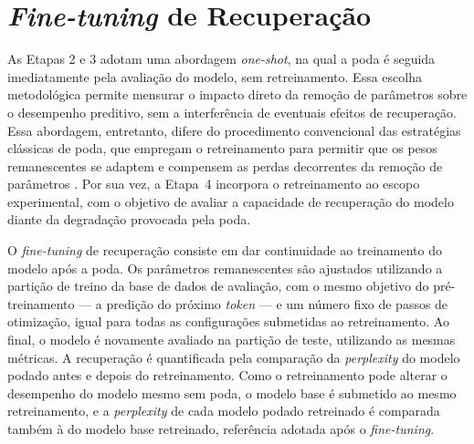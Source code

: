\section{\textit{Fine-tuning} de Recuperação}\label{sec:metodologia_finetuning}

As Etapas 2 e 3 adotam uma abordagem \textit{one-shot}, na qual a poda é seguida
imediatamente pela avaliação do modelo, sem retreinamento. Essa escolha metodológica permite
mensurar o impacto direto da remoção de parâmetros sobre o desempenho preditivo, sem a
interferência de eventuais efeitos de recuperação. Essa abordagem, entretanto, difere do
procedimento convencional das estratégias clássicas de poda, que empregam o retreinamento
para permitir que os pesos remanescentes se adaptem e compensem as perdas decorrentes da
remoção de parâmetros \cite{Han2015,Li2017}. Por sua vez, a
Etapa~4 incorpora o retreinamento ao escopo experimental, com o objetivo de avaliar a
capacidade de recuperação do modelo diante da degradação provocada pela poda.

O \textit{fine-tuning} de recuperação consiste em dar continuidade ao treinamento do modelo
após a poda. Os parâmetros remanescentes são ajustados utilizando a partição de treino da
base de dados de avaliação, com o mesmo objetivo do pré-treinamento --- a predição do próximo
\textit{token} --- e um número fixo de passos de otimização, igual para todas as
configurações submetidas ao retreinamento. Ao final, o modelo é novamente avaliado na
partição de teste, utilizando as mesmas métricas. A
recuperação é quantificada pela comparação da \textit{perplexity} do modelo podado antes e
depois do retreinamento. Como o retreinamento pode alterar o desempenho do modelo mesmo sem
poda, o modelo base é submetido ao mesmo retreinamento, e a \textit{perplexity} de cada modelo
podado retreinado é comparada também à do modelo base retreinado, referência adotada após o
\textit{fine-tuning}.

